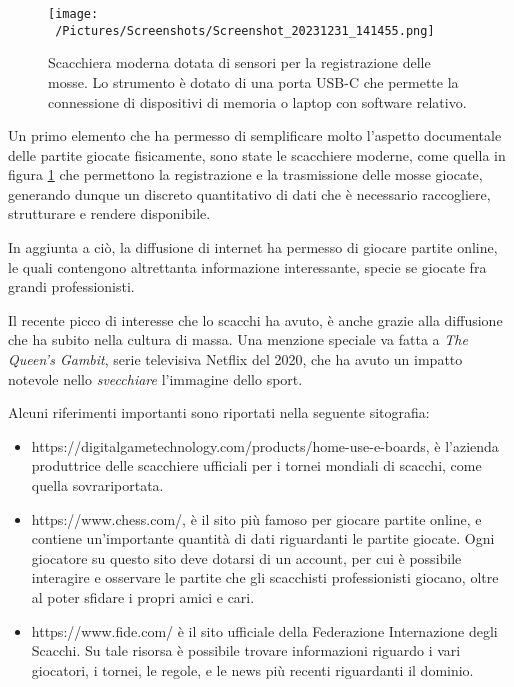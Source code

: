 \documentclass[12pt]{book}
\begin{document}
\begin{figure}[h]
  \caption{Scacchiera moderna dotata di sensori per la registrazione
  delle mosse. Lo strumento è dotato di una porta USB-C che permette
  la connessione di dispositivi di memoria o laptop con software
  relativo.}
  \centering
  \label{fig:scacchiera}
  \texttt{[image: ~/Pictures/Screenshots/Screenshot\_20231231\_141455.png]}
\end{figure} 

Un primo elemento che ha permesso di
semplificare molto l'aspetto documentale
delle partite giocate fisicamente, sono state le scacchiere moderne,
come quella in figura \ref{fig:scacchiera} che
permettono la registrazione e la trasmissione delle mosse giocate,
generando dunque un discreto quantitativo di dati che è necessario
raccogliere, strutturare e rendere disponibile.

In aggiunta a ciò, la diffusione di internet ha permesso di giocare
partite
online, le quali contengono altrettanta informazione interessante,
specie se giocate fra grandi professionisti. 

Il recente picco di interesse che lo scacchi ha avuto, è anche grazie alla 
diffusione che ha subito nella cultura di
massa. Una menzione speciale va fatta a \textit{The Queen's Gambit}, 
serie televisiva Netflix del 2020, che ha avuto un impatto notevole nello
\textit{svecchiare} l'immagine dello sport.


Alcuni riferimenti importanti sono riportati nella seguente
sitografia:
\begin{itemize}
  \item
    https://digitalgametechnology.com/products/home-use-e-boards, è
    l'azienda produttrice delle scacchiere ufficiali per i tornei
    mondiali di scacchi, come quella sovrariportata.
  \item https://www.chess.com/, è il sito più famoso per giocare
    partite online, e contiene un'importante quantità di dati
    riguardanti le partite giocate. Ogni giocatore su questo sito deve
    dotarsi di un account, per cui è possibile interagire e osservare
    le partite che gli scacchisti professionisti giocano, oltre al
    poter sfidare i propri amici e cari.
  \item https://www.fide.com/ è il sito ufficiale della Federazione
    Internazione degli Scacchi. Su tale risorsa è possibile trovare
    informazioni riguardo i vari giocatori, i tornei, le regole, e le
    news più recenti riguardanti il dominio.
\end{itemize}
\end{document}
